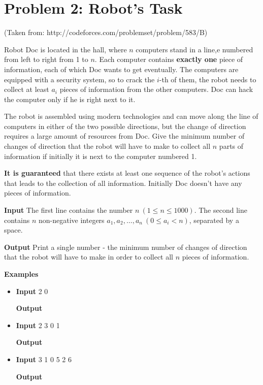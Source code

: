 \normalfont\documentclass[letterpaper,11pt]{article}
\begin{document}
\section*{Problem 2: Robot's Task}
(Taken from: http://codeforces.com/problemset/problem/583/B)

Robot Doc is located in the hall, where $n$ computers stand in a line,e numbered from left to right from 1 to $n$. Each computer contains \textbf{exactly one} piece of information, each of which Doc wants to get eventually. The computers are equipped with a security system, so to crack the $i$-th of them, the robot needs to collect at least $a_i$ pieces of information from the other computers. Doc can hack the computer only if he is right next to it.

The robot is assembled using modern technologies and can move along the line of computers in either of the two possible directions, but the change of direction requires a large amount of resources from Doc. Give the minimum number of changes of direction that the robot will have to make to collect all $n$ parts of information if initially it is next to the computer numbered 1.

\textbf{It is guaranteed} that there exists at least one sequence of the robot's actions that leads to the collection of all information. Initially Doc doesn't have any pieces of information.

\textbf{Input} \newline
The first line contains the number $n \ (1 \leq n \leq 1000)$. The second line contains $n$ non-negative integers $a_1, a_2, \ldots, a_n \ (0 \leq a_i < n)$, separated by a space.

\textbf{Output} \newline
Print a single number - the minimum number of changes of direction that the robot will have to make in order to collect all $n$ pieces of information.

\textbf{Examples} \newline
\begin{itemize}
\item \textbf{Input}   2 0

\textbf{Output} 

\item \textbf{Input}   2 3 0 1

\textbf{Output} 

\item \textbf{Input}   3 1 0 5 2 6

\textbf{Output} 
\end{itemize}
\end{document}
